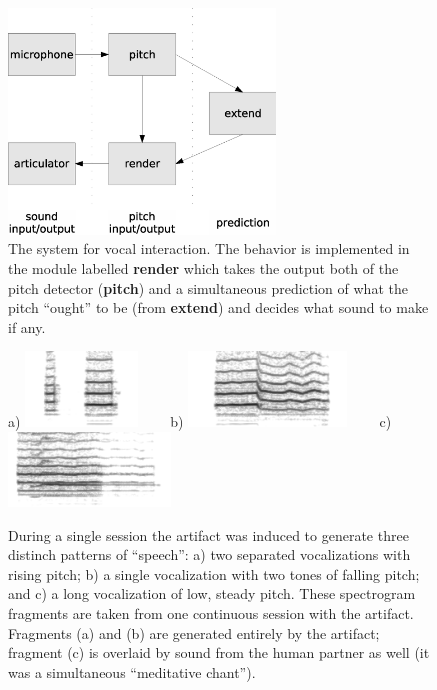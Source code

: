 
\begin{figure}[bt]
\centerline{\includegraphics[height=6cm]{images/sing-modules}}
\caption {
%
\label{fig:sing-module}
%
The system for vocal interaction.
The behavior is implemented in the module labelled {\bf render} which
takes the output both of the pitch detector ({\bf pitch}) and a simultaneous 
prediction of what the pitch ``ought'' to be (from {\bf extend})
and decides what sound to make if any.
%
}
\end{figure}


\begin{figure}[bt]

\centerline{
a)
\includegraphics[height=2cm]{images/chico-output-separate-high-low}
\ \ 
\ \ 
b)
\includegraphics[height=2cm]{images/chico-output-pair-high-low}
\ \ 
\ \ 
c)
\includegraphics[height=2cm]{images/chico-output-ohm}
}

\caption{
%
\label{fig:singing-outcome}
%
During a single session the artifact was induced
to generate three distinch patterns of ``speech'': a) two separated
vocalizations with rising pitch; b) a single vocalization with
two tones of falling pitch; and c) a long vocalization of low, steady
pitch.
%
These spectrogram fragments are taken from one continuous session
with the artifact.  Fragments (a) and (b) are generated entirely
by the artifact; fragment (c) is overlaid by sound from
the human partner as well (it was a simultaneous ``meditative chant'').
%
}

\end{figure}





